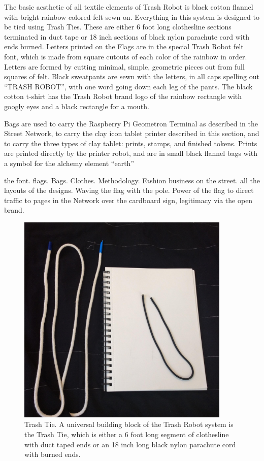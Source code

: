 The basic aesthetic of all textile elements of Trash Robot is black cotton flannel with bright rainbow colored felt sewn on.  Everything in this system is designed to be tied using Trash Ties.  These are either 6 foot long clothesline sections terminated in duct tape or 18 inch sections of black nylon parachute cord with ends burned.   Letters printed on the Flags are in the special Trash Robot felt font, which is made from square cutouts of each color of the rainbow in order.  Letters are formed by cutting minimal, simple, geometric pieces out from full squares of felt.  Black sweatpants are sewn with the letters, in all caps spelling out ``TRASH ROBOT'', with one word going down each leg of the pants.  The black cotton t-shirt has the Trash Robot brand logo of the rainbow rectangle with googly eyes and a black rectangle for a mouth.  

Bags are used to carry the Raspberry Pi Geometron Terminal as described in the Street Network, to carry the clay icon tablet printer described in this section, and to carry the three types of clay tablet: prints, stamps, and finished tokens.  Prints are printed directly by the printer robot, and are in small black flannel bags with a symbol for the alchemy element ``earth''

the font. flags. Bags. Clothes.  Methodology. Fashion business on the street. all the layouts of the designs.  Waving the flag with the pole. Power of the flag to direct traffic to pages in the Network over the cardboard sign, legitimacy via the open brand.


\begin{figure}
	\centering
	\includegraphics[width=4in]{figures/trashrobot/trashtie.jpg}
	\caption[trashtie]
	{Trash Tie. A universal building block of the Trash Robot system is the Trash Tie, which is either a 6 foot long segment of clothesline with duct taped ends or an 18 inch long black nylon parachute cord with burned ends.}
\end{figure}

